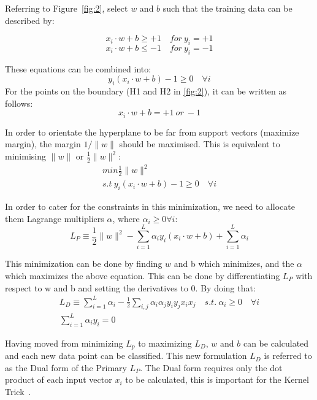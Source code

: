\documentclass[letterpaper,10pt]{article}
\theoremstyle{mytheor}
\begin{document}
Referring to Figure~\ref{fig:2}, select $w$ and $b$ such that the training data can be described by:

\begin{equation}
x_i \cdot w + b \geq  +1 \quad for\ y_i = +1
\end{equation}
\begin{equation}
x_i \cdot w + b \leq -1 \quad for\ y_i = -1
\end{equation}

These equations can be combined into:
\begin{equation}
y_i (x_i \cdot w + b) - 1 \geq 0 \quad \forall i
\end{equation}
For the points on the boundary (H1 and H2 in \ref{fig:2}), it can be written as follows:
\begin{equation}
x_i \cdot w + b = +1\ or\ -1  
\end{equation}

In order to orientate the hyperplane to be far from support vectors (maximize margin), the margin $1/\|w\|$   should be maximised. This is equivalent to minimising $\|w\|$ or $\frac{1}{2}\|w\|^{2}$:
\begin{gather}
min \frac{1}{2} \|w\|^{2} \\ 
s.t\  y_i (x_i \cdot w + b) -1 \geq 0 \quad \forall i
\end{gather}

In order to cater for the constraints in this minimization, we need to allocate them Lagrange multipliers $\alpha$, where $\alpha_{i} \geq 0 \forall i$:
\begin{equation}
L_P \equiv \frac{1}{2} \|w\|^{2} - \sum^{L}_{i=1}  \alpha_{i}y_i (x_i \cdot w + b) + \sum^{L}_{i=1} \alpha_{i}
\end{equation}

This minimization can be done by finding $w$ and b which minimizes, and the $\alpha$ which maximizes the above equation. This can be done by differentiating $L_P$ with respect to  w and b and setting the derivatives to 0. By doing that:
\begin{gather}
L_D \equiv \sum^{L}_{i=1} \alpha_{i} - \frac{1}{2} \sum_{i,j} \alpha_{i}\alpha_{j}y_i y_j x_i x_j \quad s.t.\ \alpha_{i} \geq 0 \quad \forall i \\
\sum^{L}_{i=1}  \alpha_{i}y_i = 0  
\end{gather}

Having moved from minimizing $L_p$ to maximizing $L_D$, $w$ and $b$ can be calculated and each new data point can be classified. This new formulation $L_D$ is referred to as the Dual form of the Primary $L_P$. The Dual form requires only the dot product of each input vector $x_i$ to be calculated, this is important for the Kernel Trick~\cite{fletcher2009support}.
\end{document}
